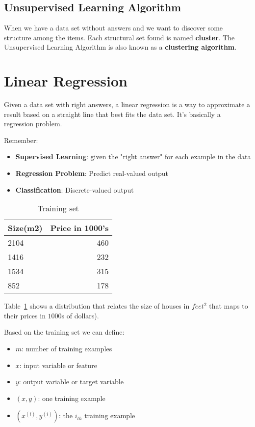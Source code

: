 \documentclass[a4paper]{article}
\begin{document}
\subsection{Unsupervised Learning Algorithm}

When we have a data set without answers and we want to discover some structure among the items. Each structural set found is named \textbf{cluster}. The Unsupervised Learning Algorithm is also known as a \textbf{clustering algorithm}.

\section{Linear Regression}

Given a data set with right answers, a linear regression is a way to approximate a result based on a straight line that best fits the data set. It's basically a regression problem.

\medskip

Remember:

\begin{itemize}
\item \textbf{Supervised Learning}: given the "right answer" for each example in the data
\item \textbf{Regression Problem}: Predict real-valued output
\item \textbf{Classification}: Discrete-valued output
\end{itemize}

\begin{table}[]
\centering
\begin{tabular}{l|r}
\textbf{Size(m2)} & \textbf{Price in 1000's} \\\hline
2104     & 460 \\
1416     & 232 \\
1534     & 315 \\
852      & 178
\end{tabular}
\caption{Training set}
\label{tab:training-set-example}
\end{table}

Table~\ref{tab:training-set-example} shows a distribution that relates the size of houses in $feet^2$ that maps to their prices in $1000$s of dollars).

Based on the training set we can define:

\begin{itemize}
\item $m$: number of training examples
\item $x$: input variable or feature
\item $y$: output variable or target variable
\item $(x,y)$: one training example
\item $(x^{(i)}, y^{(i)})$: the $i_{th}$ training example
\end{itemize}
\end{document}
